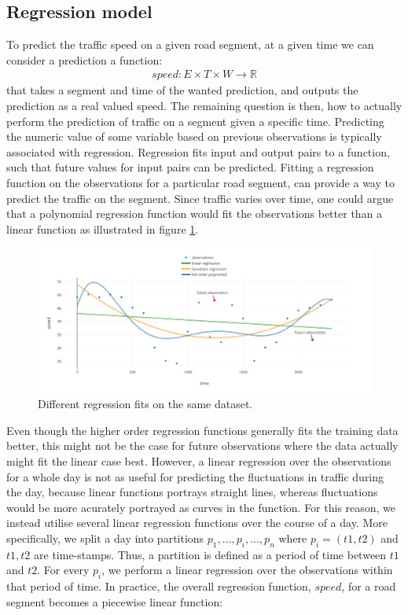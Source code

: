 \subsection{Regression model}\label{patterns:regression-model}
To predict the traffic speed on a given road segment, at a given time we can consider a prediction a function:
\begin{align*}
speed: E \times T \times W \rightarrow \mathbb{R}
\end{align*}
that takes a segment and time of the wanted prediction, and outputs the prediction as a real valued speed. The remaining question is then, how to actually perform the prediction of traffic on a segment given a specific time.
Predicting the numeric value of some variable based on previous observations is typically associated with regression. Regression fits input and output pairs to a function, such that future values for input pairs can be predicted. Fitting a regression function on the observations for a particular road segment, can provide a way to predict the traffic on the segment. Since traffic varies over time, one could argue that a polynomial regression function would fit the observations better than a linear function as illustrated in figure \ref{fig:compare-regression}.
\begin{figure}
\label{fig:compare-regression}
\includegraphics[width=\textwidth]{figures/compare-regression.pdf}
\caption{Different regression fits on the same dataset.}
\end{figure}
Even though the higher order regression functions generally fits the training data better, this might not be the case for future observations where the data actually might fit the linear case best. However, a linear regression over the observations for a whole day is not as useful for predicting the fluctuations in traffic during the day, because linear functions portrays straight lines, whereas fluctuations would be more acurately portrayed as curves in the function. For this reason, we instead utilise several linear regression functions over the course of a day. More specifically, we split a day  into partitions $p_1,...,p_i,...,p_n$ where $p_i = (t1,t2)$ and $t1,t2$ are time-stamps. Thus, a partition is defined as a period of time between $t1$ and $t2$. For every $p_i$, we perform a linear regression over the observations within that period of time. In practice, the overall regression function, $speed$, for a road segment becomes a piecewise linear function:
